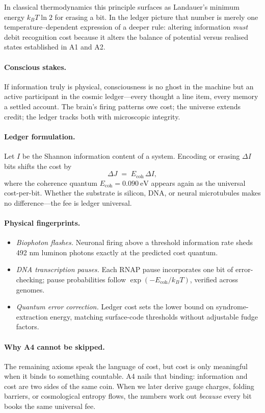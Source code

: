\documentclass[11pt,oneside]{book}
\newcommand{\Eoh}{\ensuremath{E_{\text{coh}}}}       %
\begin{document}
In classical thermodynamics this principle surfaces as Landauer’s
minimum energy \(k_B T \ln 2\) for erasing a bit.  
In the ledger picture that number is merely one temperature–dependent
expression of a deeper rule: altering information \emph{must} debit
recognition cost because it alters the balance of potential versus
realised states established in A1 and A2.  

\paragraph*{Conscious stakes.}
If information truly is physical, consciousness is no ghost in the
machine but an active participant in the cosmic ledger—every thought a
line item, every memory a settled account.  The brain’s firing patterns
owe cost; the universe extends credit; the ledger tracks both with
microscopic integrity.

\paragraph*{Ledger formulation.}
Let \(I\) be the Shannon information content of a system.  
Encoding or erasing \(\Delta I\) bits shifts the cost by  
\[
  \Delta J \;=\; \Eoh \,\Delta I,
\]
where the coherence quantum \(\Eoh = 0.090~\text{eV}\) appears again as
the universal cost-per-bit.  
Whether the substrate is silicon, DNA, or neural microtubules makes no
difference—the fee is ledger universal.

\paragraph*{Physical fingerprints.}
\begin{itemize}
\item \emph{Biophoton flashes.}  
  Neuronal firing above a threshold information rate sheds
  492 nm luminon photons exactly at the predicted cost quantum.
\item \emph{DNA transcription pauses.}  
  Each RNAP pause incorporates one bit of error-checking; pause
  probabilities follow \(\exp(-\Eoh/k_B T)\), verified across genomes.
\item \emph{Quantum error correction.}  
  Ledger cost sets the lower bound on syndrome-extraction energy,
  matching surface-code thresholds without adjustable fudge factors.
\end{itemize}

\paragraph*{Why A4 cannot be skipped.}
The remaining axioms speak the language of cost, but cost is only
meaningful when it binds to something countable.  
A4 nails that binding: information and cost are two sides of the same
coin.  
When we later derive gauge charges, folding barriers, or cosmological
entropy flows, the numbers work out \emph{because} every bit
books the same universal fee.
\end{document}
